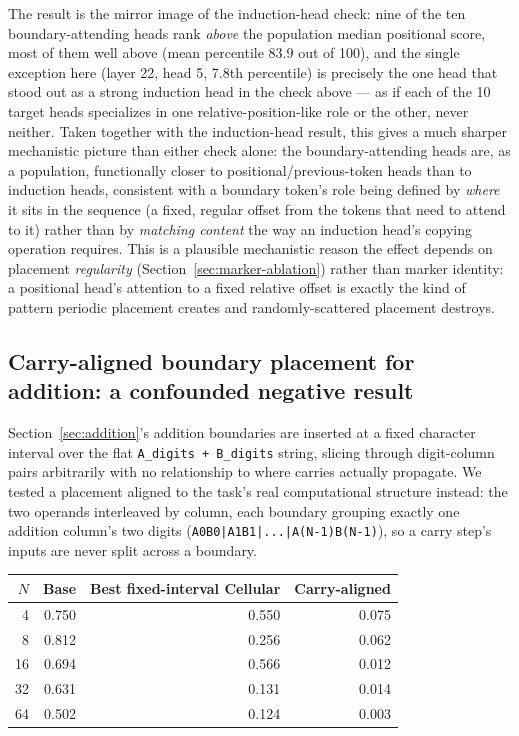 \documentclass[11pt]{article}
\begin{document}
The result is the mirror image of the induction-head check: nine of the ten boundary-attending heads rank \emph{above} the population median positional score, most of them well above (mean percentile 83.9 out of 100), and the single exception here (layer 22, head 5, 7.8th percentile) is precisely the one head that stood out as a strong induction head in the check above --- as if each of the 10 target heads specializes in one relative-position-like role or the other, never neither. Taken together with the induction-head result, this gives a much sharper mechanistic picture than either check alone: the boundary-attending heads are, as a population, functionally closer to positional/previous-token heads than to induction heads, consistent with a boundary token's role being defined by \emph{where} it sits in the sequence (a fixed, regular offset from the tokens that need to attend to it) rather than by \emph{matching content} the way an induction head's copying operation requires. This is a plausible mechanistic reason the effect depends on placement \emph{regularity} (Section~\ref{sec:marker-ablation}) rather than marker identity: a positional head's attention to a fixed relative offset is exactly the kind of pattern periodic placement creates and randomly-scattered placement destroys.

\subsection{Carry-aligned boundary placement for addition: a confounded negative result}

Section~\ref{sec:addition}'s addition boundaries are inserted at a fixed character interval over the flat \texttt{A\_digits + B\_digits} string, slicing through digit-column pairs arbitrarily with no relationship to where carries actually propagate. We tested a placement aligned to the task's real computational structure instead: the two operands interleaved by column, each boundary grouping exactly one addition column's two digits (\texttt{A0B0|A1B1|...|A(N-1)B(N-1)}), so a carry step's inputs are never split across a boundary.

\begin{table}[htbp]
\centering
\small
\begin{tabular}{rrrr}
\toprule
$N$ & Base & Best fixed-interval Cellular & Carry-aligned \\
\midrule
4  & 0.750 & 0.550 & 0.075 \\
8  & 0.812 & 0.256 & 0.062 \\
16 & 0.694 & 0.566 & 0.012 \\
32 & 0.631 & 0.131 & 0.014 \\
64 & 0.502 & 0.124 & 0.003 \\
\bottomrule
\end{tabular}
\end{table}
\end{document}
